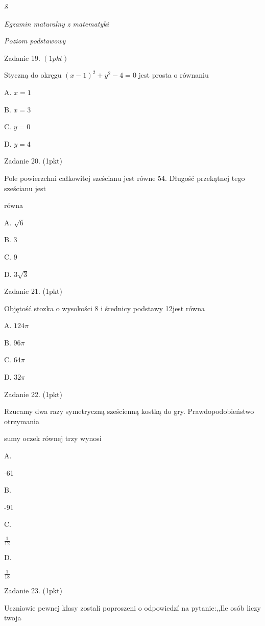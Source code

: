 \documentclass[a4paper,12pt]{article}
\begin{document}
{\it 8}

{\it Egzamin maturalny z matematyki}

{\it Poziom podstawowy}

Zadanie 19. $(1pkt)$

Styczną do okręgu $(x-1)^{2}+y^{2}-4=0$ jest prosta o równaniu

A. $x=1$

B. $x=3$

C. $y=0$

D. $y=4$

Zadanie 20. (1pkt)

Pole powierzchni całkowitej sześcianu jest równe 54. Długość przekątnej tego sześcianu jest

równa

A. $\sqrt{6}$

B. 3

C. 9

D. $3\sqrt{3}$

Zadanie 21. (1pkt)

Objętość stozka o wysokości 8 i średnicy podstawy 12jest równa

A. $ 124\pi$

B. $ 96\pi$

C. $ 64\pi$

D. $ 32\pi$

Zadanie 22. (1pkt)

Rzucamy dwa razy symetryczną sześcienną kostką do gry. Prawdopodobieństwo otrzymania

sumy oczek równej trzy wynosi

A.

-61

B.

-91

C.

$\displaystyle \frac{1}{12}$

D.

$\displaystyle \frac{1}{18}$

Zadanie 23. (1pkt)

Uczniowie pewnej klasy zostali poproszeni o odpowiedzí na pytanie:,,Ile osób liczy twoja
\end{document}
